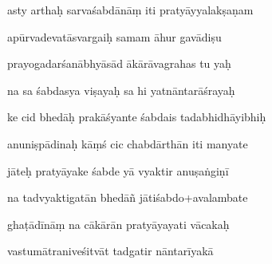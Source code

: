 \documentclass[article,12pt,a4paper]{memoir}%
\newcounter{parCount}
\begin{document}
	  
	  \pstart {} asty arthaḥ sarvaśabdānāṃ iti pratyāyyalakṣaṇam 
	{}
	\pend%
      

	  
	  \pstart \leavevmode%
	apūrvadevatāsvargaiḥ samam āhur gavādiṣu 
	{}
	\pend%
      

	  
	  \pstart {} prayogadarśanābhyāsād ākārāvagrahas tu yaḥ 
	{}
	\pend%
      

	  
	  \pstart \leavevmode%
	na sa śabdasya viṣayaḥ sa hi yatnāntarāśrayaḥ 
	{}
	\pend%
      

	  
	  \pstart {} ke cid bhedāḥ prakāśyante śabdais tadabhidhāyibhiḥ 
	{}
	\pend%
      

	  
	  \pstart \leavevmode%
	anuniṣpādinaḥ kāṃś cic chabdārthān iti manyate 
	{}
	\pend%
      

	  
	  \pstart {} jāteḥ pratyāyake śabde yā vyaktir anuṣaṅgiṇī 
	{}
	\pend%
      

	  
	  \pstart \leavevmode%
	na tadvyaktigatān bhedāñ jātiśabdo+avalambate 
	{}
	\pend%
      

	  
	  \pstart {} ghaṭādīnāṃ na cākārān pratyāyayati vācakaḥ 
	{}
	\pend%
      

	  
	  \pstart \leavevmode%
	vastumātraniveśitvāt tadgatir nāntarīyakā 
	{}
	\pend%
      
\end{document}
